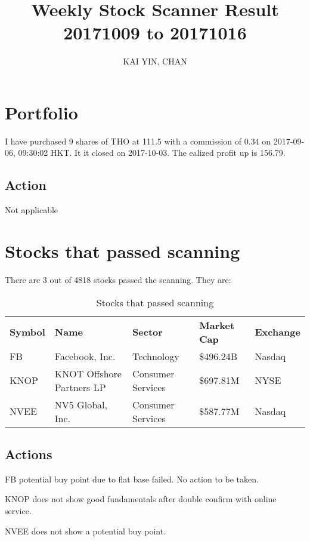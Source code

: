 \documentclass{article}
\begin{document}
\title{Weekly Stock Scanner Result \\ 20171009 to 20171016}
\author{KAI YIN, CHAN}
\maketitle

\section{Portfolio}
I have purchased 9 shares of THO at 111.5 with a commission of 0.34 on 2017-09-06, 09:30:02 HKT. It it closed on 2017-10-03. The ealized profit up  is 156.79.

\subsection{Action}
Not applicable

\section{Stocks that passed scanning}

There are 3 out of 4818 stocks passed the scanning.  They are:
\begin{table}[htbp]
  \caption{Stocks that passed scanning}
    \begin{tabular}{lllll}
    \textbf{Symbol} & \textbf{Name} & \textbf{Sector} & \textbf{Market Cap} & \textbf{Exchange} \\
    FB    & Facebook, Inc. & Technology & \$496.24B & Nasdaq \\
    KNOP  & KNOT Offshore Partners LP & Consumer Services & \$697.81M & NYSE \\
    NVEE  & NV5 Global, Inc. & Consumer Services & \$587.77M & Nasdaq \\
    \end{tabular}%
  \label{tab:addlabel}%
\end{table}%

\subsection{Actions}
FB potential buy point due to flat base failed. No action to be taken.

KNOP does not show good fundamentals after double confirm with online service.

NVEE does not show a potential buy point. 
\end{document}
